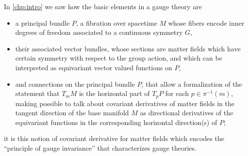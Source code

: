 In \ref{chp:intro} we saw how the basic elements in a gauge theory are 
    \begin{itemize}
        
    \item a principal bundle $P$, a fibration over spacetime $M$ whose fibers encode inner degrees of freedom associated to a continuous symmetry $G$,
    
    \item their associated vector bundles, whose sections are matter fields which have certain symmetry with respect to the group action, and which can be interpreted as equivariant vector valued functions on $P$,
    
    \item and connections on the principal bundle $P$, that allow a formalization of the statement that $T_m M$ is the horizontal part of $T_p P$ for each $p \in \pi^{-1}(m)$, making possible to talk about covariant derivatives of matter fields in the tangent direction of the base manifold $M$ as directional derivatives of the equivariant functions in the corresponding horizontal direction(s) of $P$;
    
    \end{itemize}
it is this notion of covariant derivative for matter fields which encodes the ``principle of gauge invariance'' that characterizes gauge theories.

